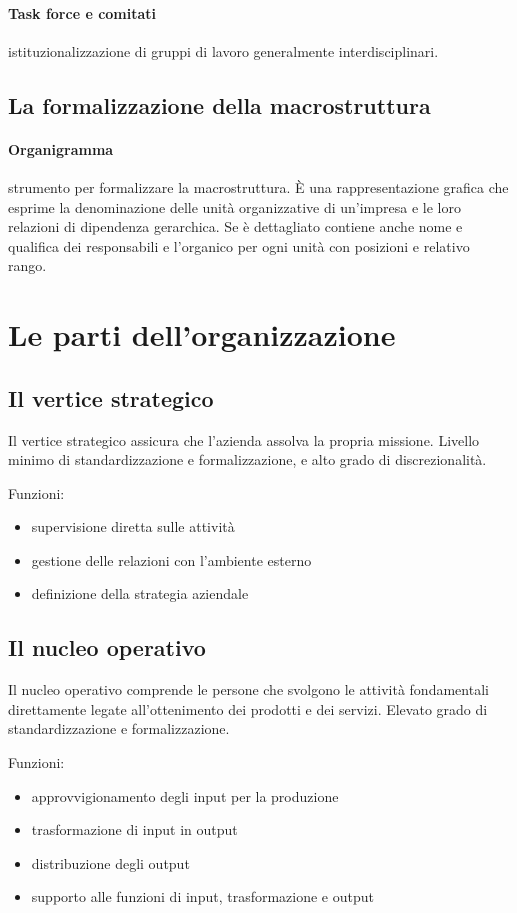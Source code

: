\paragraph{Task force e comitati}
istituzionalizzazione di gruppi di lavoro generalmente interdisciplinari.

\subsection{La formalizzazione della macrostruttura}
\paragraph{Organigramma}
strumento per formalizzare la macrostruttura.
È una rappresentazione grafica che esprime la denominazione delle unità
organizzative di un'impresa e le loro relazioni di dipendenza gerarchica. Se è dettagliato contiene anche nome e qualifica dei responsabili e l'organico per ogni unità con posizioni e relativo rango.

\section{Le parti dell’organizzazione}

\subsection{Il vertice strategico}
Il vertice strategico assicura che l’azienda assolva la
propria missione.
Livello minimo di standardizzazione e formalizzazione,
e alto grado di discrezionalità.

Funzioni:
\begin{itemize}
	\item supervisione diretta sulle attività
	\item gestione delle relazioni con l’ambiente esterno
	\item definizione della strategia aziendale
\end{itemize}

\subsection{Il nucleo operativo}
Il nucleo operativo comprende le persone che svolgono
le attività fondamentali direttamente legate
all'ottenimento dei prodotti e dei servizi.
Elevato grado di standardizzazione e formalizzazione.

Funzioni:
\begin{itemize}
	\item approvvigionamento degli input per la produzione
	\item trasformazione di input in output
	\item distribuzione degli output
	\item supporto alle funzioni di input, trasformazione e output
\end{itemize}

